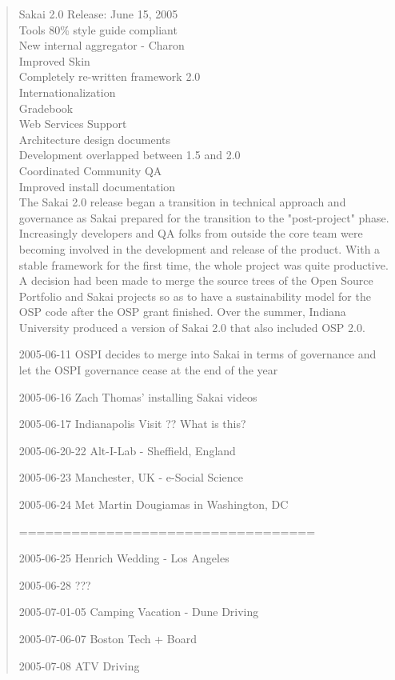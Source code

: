 \begin{quote}
Sakai 2.0 Release: June 15, 2005\\
Tools 80\%  style guide compliant\\
New internal aggregator - Charon\\
Improved Skin\\
Completely re-written framework 2.0\\
Internationalization\\
Gradebook\\
Web Services Support\\
Architecture design documents\\
Development overlapped between 1.5 and 2.0\\
Coordinated Community QA\\
Improved install documentation\\

The Sakai 2.0 release began a transition in technical approach and governance as Sakai prepared for the transition to the "post-project" phase.  Increasingly developers and QA folks from outside the core team were becoming involved in the development and release of the product.  With a stable framework for the first time, the whole project was quite productive.  A decision had been made to merge the source trees of the Open Source Portfolio and Sakai projects so as to have a sustainability model for the OSP code after the OSP grant finished.   Over the summer, Indiana University produced a version of Sakai 2.0 that also included OSP 2.0.

2005-06-11 OSPI decides to merge into Sakai in terms of governance and let the OSPI governance cease at the end of the year

2005-06-16 Zach Thomas' installing Sakai videos

2005-06-17 Indianapolis Visit ?? What is this?

2005-06-20-22 Alt-I-Lab - Sheffield, England

2005-06-23 Manchester, UK - e-Social Science

2005-06-24 Met Martin Dougiamas in Washington, DC

==================================

2005-06-25 Henrich Wedding - Los Angeles

2005-06-28 ???

2005-07-01-05 Camping Vacation - Dune Driving

2005-07-06-07 Boston Tech + Board

2005-07-08 ATV Driving


\end{quote}
